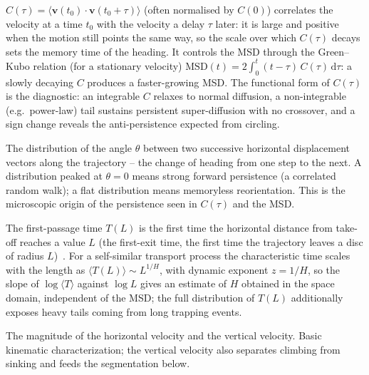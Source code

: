 \begin{description}
        $C(\tau)=\langle\mathbf{v}(t_0)\cdot\mathbf{v}(t_0+\tau)\rangle$ (often normalised by
        $C(0)$) correlates the velocity at a time $t_0$ with the velocity a delay $\tau$
        later: it is large and positive when the motion still points the same way, so the
        scale over which $C(\tau)$ decays sets the memory time of the heading. It controls
        the MSD through the Green--Kubo relation (for a stationary velocity)
        $\mathrm{MSD}(t)=2\!\int_0^{t}\!(t-\tau)\,C(\tau)\,\mathrm{d}\tau$: a slowly decaying
        $C$ produces a faster-growing MSD. The functional form of $C(\tau)$ is the
        diagnostic: an integrable
        $C$ relaxes to normal diffusion, a non-integrable (e.g.\ power-law) tail sustains
        persistent super-diffusion with no crossover, and a sign change reveals the
        anti-persistence expected from circling.
  \item[Turning-angle distribution.] The distribution of the angle $\theta$ between two
        successive horizontal displacement vectors along the trajectory -- the change of
        heading from one step to the next. A distribution peaked at $\theta=0$ means strong
        forward persistence (a correlated random walk); a flat distribution means memoryless
        reorientation. This is the microscopic origin of the persistence seen in $C(\tau)$ and
        the MSD.
  \item[First-passage and first-exit times.] The first-passage time $T(L)$ is the first time
        the horizontal distance from take-off reaches a value $L$ (the first-exit time, the
        first time the trajectory leaves a disc of radius $L$)~\cite{redner2001}. For a self-similar transport
        process the characteristic time scales with the length as
        $\langle T(L)\rangle\sim L^{1/H}$, with dynamic exponent $z=1/H$, so the slope of
        $\log\langle T\rangle$ against $\log L$ gives an estimate of $H$ obtained in the space
        domain, independent of the MSD; the full distribution of $T(L)$ additionally exposes
        heavy tails coming from long trapping events.
  \item[Speed and vertical-velocity distributions.] The magnitude of the horizontal velocity
        and the vertical velocity. Basic kinematic characterization; the vertical velocity also
        separates climbing from sinking and feeds the segmentation below.
\end{description}

